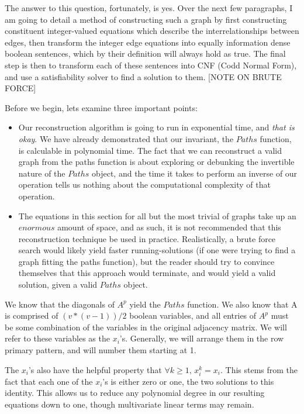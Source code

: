 \documentclass[11pt,a4paper]{report}
\begin{document}
The answer to this question, fortunately, is yes.  
Over the next few paragraphs, I am going to detail a method of constructing such a graph by first constructing constituent integer-valued equations which describe the interrelationships between edges, then transform the integer edge equations into equally information dense boolean sentences, which by their definition will always hold as true.  
The final step is then to transform each of these sentences into CNF (Codd Normal Form), and use a satisfiability solver to find a solution to them.
[NOTE ON BRUTE FORCE]

Before we begin, lets examine three important points:
\begin{itemize}
  \item{
  	Our reconstruction algorithm is going to run in exponential time, and \emph{that is okay}.  
  	We have already demonstrated that our invariant, the $Paths$ function, is calculable in polynomial time.  
  	The fact that we can reconstruct a valid graph from the paths function is about exploring or debunking the invertible nature of the $Paths$ object, 
  	and the time it takes to perform an inverse of our operation tells us nothing about the computational complexity of that operation.
  }
  \item{
  	The equations in this section for all but the most trivial of graphs take up an $enormous$ amount of space, and as such, it is not recommended that this reconstruction technique be used in practice.  
  	Realistically, a brute force search would likely yield faster running-solutions (if one were trying to find a graph fitting the paths function), but the reader should try to convince themselves that this approach would terminate, 
  	and would yield a valid solution, given a valid $Paths$ object.
  }
\end{itemize}

We know that the diagonals of $A^p$ yield the $Paths$ function.
We also know that A is comprised of $(v * (v - 1)) / 2$ boolean variables, and all entries of $A^p$ must be some combination of the variables in the original adjacency matrix. 
We will refer to these variables as the $x_i$'s. Generally, we will arrange them in the row primary pattern, and will number them starting at 1.

The $x_i$'s also have the helpful property that $\forall k \geq 1,\, x_i^k = x_i $. 
This stems from the fact that each one of the $x_i$'s is either zero or one, the two solutions to this identity.  
This allows us to reduce any polynomial degree in our resulting equations down to one, though multivariate linear terms may remain.
\end{document}
